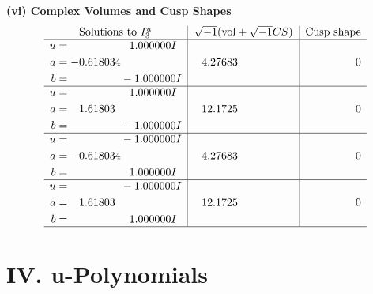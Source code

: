 \documentclass[1p]{elsarticle_modified}
\theoremstyle{definition}
\newcommand{\I}{\sqrt{-1}}
\begin{document}
\newpage\flushleft \textbf{(vi) Complex Volumes and Cusp Shapes}
$$\begin{array}{c|c|c}  
\text{Solutions to }I^u_{3}& \I (\text{vol} + \sqrt{-1}CS) & \text{Cusp shape}\\
 \hline 
\begin{aligned}
u &= \phantom{-0.000000 -}1.000000 I \\
a &= -0.618034\phantom{ +0.000000I} \\
b &= \phantom{-0.000000 } -1.000000 I\end{aligned}
 & \phantom{-}4.27683\phantom{ +0.000000I} & \phantom{-0.000000 } 0 \\ \hline\begin{aligned}
u &= \phantom{-0.000000 -}1.000000 I \\
a &= \phantom{-}1.61803\phantom{ +0.000000I} \\
b &= \phantom{-0.000000 } -1.000000 I\end{aligned}
 & \phantom{-}12.1725\phantom{ +0.000000I} & \phantom{-0.000000 } 0 \\ \hline\begin{aligned}
u &= \phantom{-0.000000 } -1.000000 I \\
a &= -0.618034\phantom{ +0.000000I} \\
b &= \phantom{-0.000000 -}1.000000 I\end{aligned}
 & \phantom{-}4.27683\phantom{ +0.000000I} & \phantom{-0.000000 } 0 \\ \hline\begin{aligned}
u &= \phantom{-0.000000 } -1.000000 I \\
a &= \phantom{-}1.61803\phantom{ +0.000000I} \\
b &= \phantom{-0.000000 -}1.000000 I\end{aligned}
 & \phantom{-}12.1725\phantom{ +0.000000I} & \phantom{-0.000000 } 0\\
 \hline 
 \end{array}$$\newpage
\newpage\renewcommand{\arraystretch}{1}
\centering \section*{ IV. u-Polynomials}
\end{document}
